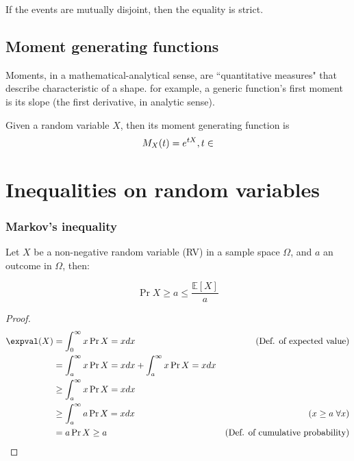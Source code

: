 If the events are mutually disjoint, then the equality is strict.


\subsection{Moment generating functions}
	
Moments, in a mathematical-analytical sense, are ``quantitative measures" that describe characteristic of a shape. for example, a generic function's first moment is its slope (the first derivative, in analytic sense).

Given a random variable $X$, then its moment generating function is
\begin{equation}
    M_X(t) = e^{tX}, t \in \real
\end{equation}


\section{Inequalities on random variables}


\subsubsection{Markov's inequality}
	
Let $X$ be a non-negative random variable (RV) in a sample space $\Omega$, and $a$ an outcome in $\Omega$, then:

\begin{equation}\label{eq:markov}
    \Pr{X \geq a} \leq \frac{\mathbb{E}[X]}{a}
\end{equation}

\begin{proof}
    \begin{align*}
        \expval(X) &= \int_{0}^{\infty} x \Pr{X = x}dx    & \text{(Def. of expected value)}         & \\
                   &= \int_{a}^{\infty} x \Pr{X = x}dx + \int_{a}^{\infty} x \Pr{X = x}dx &         & \\
                   &\geq \int_{a}^{\infty} x \Pr{X = x}dx &                                         & \\
                   &\geq \int_{a}^{\infty} a \Pr{X = x}dx & \text{($x \geq a \;\forall x$)}         & \\
                   &= a \Pr{X \geq a}                     & \text{(Def. of cumulative probability)} & \qedhere\\
    \end{align*}
\end{proof}

